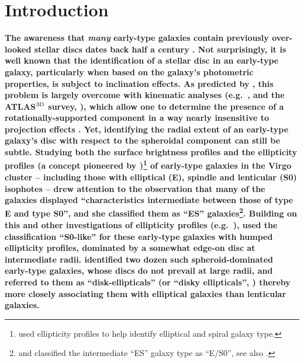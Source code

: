 \documentclass[useAMS,usenatbib,article]{mnras}
\begin{document}
\section{Introduction}
\label{sec:int}
{\bf The awareness that \emph{many} early-type galaxies contain previously over-looked stellar discs dates back half a century 
\citep{liller1966,michard1984,djorgovski1985,jedrzejewski1987,BenderMoellenhoff1987,
carter1987,capaccioli1987,capaccioli1988,stromstrom1978,bender1988,bender1990,
nieto1988,rixwhite1990,vandenbergh1990,scorzabender1990,scorzabender1995,
simienmichard1990}. 
Not surprisingly, it is well known that 
the identification of a stellar disc in an early-type galaxy, particularly when based on the galaxy's photometric properties, 
is subject to inclination effects. 
As predicted by \cite{carter1987}, this problem is largely overcome with kinematic analyses 
(e.g.~\citealt{franx1989,nieto1991,rixwhite1992,cinzanovandermarel1993,donofrio1995,graham1998fornax}, 
and the ATLAS$^{\rm 3D}$ survey, \citealt{cappellari2011}), 
which allow one to determine the presence of a rotationally-supported component 
in a way nearly insensitive to projection effects \citep{mcelroy1983,cappellari2007,emsellem2007}. 
Yet, identifying the radial extent of an early-type galaxy's disc with respect to the spheroidal component can still be subtle. 
Studying both the surface brightness profiles and the ellipticity profiles 
(a concept pioneered by \citealt{liller1960})\footnote{\cite{liller1960} 
used ellipticity profiles to help identify elliptical and spiral galaxy type.} 
of early-type galaxies in the Virgo cluster -- including those with elliptical (E), spindle and lenticular (S0) isophotes -- 
\cite{liller1966} drew attention to the observation that many of the galaxies displayed 
``characteristics intermediate between those of type E and type S0'', 
and she classified them as ``ES'' galaxies\footnote{\cite{strom1977} and \cite{stromstrom1978} 
classified the intermediate ``ES'' galaxy type as ``E/S0'', see also \cite{thompson1976}.}.  
Building on this and other investigations of ellipticity profiles (e.g.~\citealt{stromstrom1978,ditullio1979}), 
\cite{michard1984} used the classification ``S0-like'' for these early-type galaxies with humped ellipticity profiles, 
dominated by a somewhat edge-on disc at intermediate radii.  
\cite{nieto1988} identified two dozen such spheroid-dominated early-type galaxies, 
whose discs do not prevail at large radii, 
and referred to them as ``disk-ellipticals'' (or ``disky ellipticals'', \citealt{simienmichard1990}) 
thereby more closely associating them with elliptical galaxies than lenticular galaxies.   
}
\end{document}
